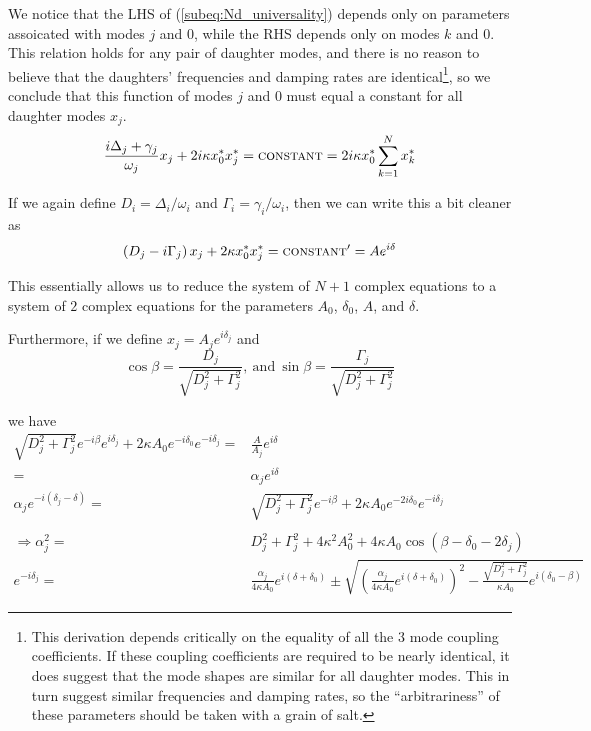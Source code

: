 We notice that the LHS of (\ref{subeq:Nd_universality}) depends only on parameters assoicated with modes $j$ and $0$, while the RHS depends only on modes $k$ and $0$. This relation holds for any pair of daughter modes, and there is no reason to believe that the daughters' frequencies and damping rates are identical\footnote{This derivation depends critically on the equality of all the 3 mode coupling coefficients. If these coupling coefficients are required to be nearly identical, it does suggest that the mode shapes are similar for all daughter modes. This in turn suggest similar frequencies and damping rates, so the ``arbitrariness'' of these parameters should be taken with a grain of salt.}, so we conclude that this function of modes $j$ and $0$ must equal a constant for all daughter modes $x_j$.
\begin{equation}
\frac{i\Delta_j + \gamma_j}{\omega_j} x_j + 2i\kappa x_0^\ast x_j^\ast  = \textsc{constant} = 2i\kappa x_0^\ast \sum_{k=1}^{N} x_k^\ast
\end{equation}

If we again define $D_i = \Delta_i/\omega_i$ and $\Gamma_i = \gamma_i/\omega_i$, then we can write this a bit cleaner as
\begin{equation} \label{eq:Nd_universality}
\left( D_j - i\Gamma_j \right ) x_j + 2\kappa x_0^\ast x_j^\ast = \textsc{constant}^\prime = A e^{i\delta}
\end{equation}

This essentially allows us to reduce the system of $N+1$ complex equations to a system of $2$ complex equations for the parameters $A_0$, $\delta_0$, $A$, and $\delta$.

Furthermore, if we define $x_j = A_j e^{i\delta_j}$ and
\begin{equation}
\cos\beta = \frac{D_j}{\sqrt{D_j^2 + \Gamma_j^2}},\ \mathrm{and}\ \sin\beta = \frac{\Gamma_j}{\sqrt{D_j^2 + \Gamma_j^2}}
\end{equation}

we have
\begin{subequations}
\begin{align}
\sqrt{D_j^2 + \Gamma_j^2} e^{-i\beta} e^{i\delta_j} + 2\kappa A_0 e^{-i\delta_0} e^{-i\delta_j} = & \frac{A}{A_j} e^{i\delta} \\
                                                                                                = & \alpha_j e^{i\delta} \\
\alpha_j e^{-i(\delta_j - \delta)} = & \sqrt{D_j^2 + \Gamma_j^2} e^{-i\beta} + 2\kappa A_0 e^{-2i\delta_0} e^{-i\delta_j} \\
 & \\
\Rightarrow \alpha_j^2  = & D_j^2 + \Gamma_j^2 + 4\kappa^2 A_0^2 + 4\kappa A_0 \cos\left(\beta - \delta_0 -2\delta_j\right) \label{subeq:a_j} \\
e^{-i\delta_j} = & \frac{\alpha_j}{4\kappa A_0} e^{i(\delta + \delta_0)} \pm \sqrt{ \left( \frac{\alpha_j}{4\kappa A_0} e^{i(\delta + \delta_0)} \right)^2 - \frac{\sqrt{D_j^2 + \Gamma_j^2}}{\kappa A_0} e^{i(\delta_0 - \beta)} } \label{subeq:d_j}
\end{align}
\end{subequations}

